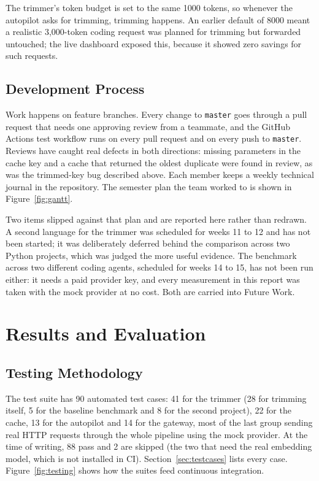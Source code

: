 \documentclass[12pt, a4paper, oneside]{report}
\newcommand{\code}[1]{\texttt{#1}}
\begin{document}
The trimmer's token budget is set to the same 1000 tokens, so whenever the
autopilot asks for trimming, trimming happens. An earlier default of 8000 meant a
realistic 3,000-token coding request was planned for trimming but forwarded
untouched; the live dashboard exposed this, because it showed zero savings for
such requests.

\section{Development Process}

Work happens on feature branches. Every change to \code{master} goes through a pull
request that needs one approving review from a teammate, and the GitHub Actions
test workflow runs on every pull request and on
every push to \code{master}. Reviews have caught real defects in both
directions: missing parameters in the cache key and a cache that returned the
oldest duplicate were found in review, as was the trimmed-key bug described above.
Each member keeps a weekly technical journal in the repository. The
semester plan the team worked to is shown in Figure~\ref{fig:gantt}.

Two items slipped against that plan and are reported here rather than redrawn.
A second language for the trimmer was scheduled for weeks 11 to 12 and has not
been started; it was deliberately deferred behind the comparison across two
Python projects, which was judged the more useful evidence. The benchmark
across two different coding agents, scheduled for weeks 14 to 15, has not been
run either: it needs a paid provider key, and every measurement in this report
was taken with the mock provider at no cost. Both are carried into Future
Work.




\chapter{Results and Evaluation}

\section{Testing Methodology}

The test suite has 90 automated test cases: 41 for the trimmer (28 for trimming
itself, 5 for the baseline benchmark and 8 for the second project), 22 for the
cache, 13 for the autopilot and 14 for the gateway, most of the last group
sending real HTTP requests through the whole pipeline using the mock provider.
At the time of writing, 88 pass and 2 are skipped (the two that need the real
embedding model, which is not installed in CI). Section~\ref{sec:testcases}
lists every case.
Figure~\ref{fig:testing} shows how the suites feed continuous integration.
\end{document}
